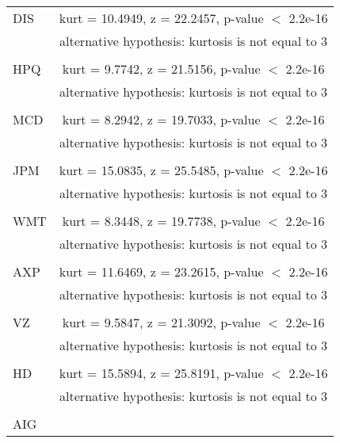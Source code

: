 \documentclass[11pt]{article}
\begin{document}
\begin{table}
\begin{tabular}{lc}
\\
DIS

	
&kurt = 10.4949, z = 22.2457, p-value $<$ 2.2e-16\\
&alternative hypothesis: kurtosis is not equal to 3\\

\\
HPQ

	
&kurt = 9.7742, z = 21.5156, p-value $<$ 2.2e-16\\
&alternative hypothesis: kurtosis is not equal to 3\\

\\
MCD

	
&kurt = 8.2942, z = 19.7033, p-value $<$ 2.2e-16\\
&alternative hypothesis: kurtosis is not equal to 3\\

\\
JPM

	
&kurt = 15.0835, z = 25.5485, p-value $<$ 2.2e-16\\
&alternative hypothesis: kurtosis is not equal to 3\\

\\
WMT

	
&kurt = 8.3448, z = 19.7738, p-value $<$ 2.2e-16\\
&alternative hypothesis: kurtosis is not equal to 3\\

\\
AXP

	
&kurt = 11.6469, z = 23.2615, p-value $<$ 2.2e-16\\
&alternative hypothesis: kurtosis is not equal to 3\\

\\
VZ

	
&kurt = 9.5847, z = 21.3092, p-value $<$ 2.2e-16\\
&alternative hypothesis: kurtosis is not equal to 3\\

\\
HD

	
&kurt = 15.5894, z = 25.8191, p-value $<$ 2.2e-16\\
&alternative hypothesis: kurtosis is not equal to 3\\

\\
AIG


\end{tabular}
\end{table}
\end{document}
